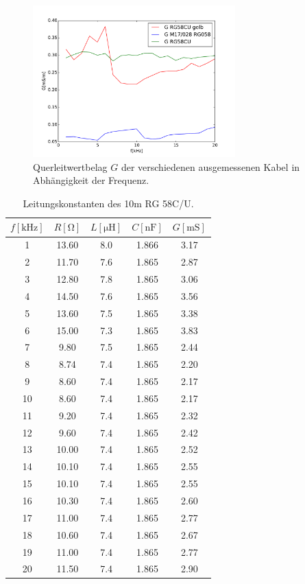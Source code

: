 \begin{figure}
\begin{minipage}{7.8cm}
	\end{minipage}
	\begin{minipage}{7.8cm}
		\includegraphics[width = 7.8cm]{data/a/G.pdf}
		\caption[]{Querleitwertbelag $G$ der verschiedenen ausgemessenen Kabel in Abhängigkeit der Frequenz.}
		\label{fig_konst4}
	\end{minipage}
\end{figure}

\begin{table}
\centering
	\caption[]{Leitungskonstanten des 10m RG 58C/U.}
    \begin{tabular}{S[table-format=2.0] S[table-format=2.2] S[table-format=1.1] S[table-format=1.3] S[table-format=1.2]}
		\toprule
        {$f[\si{\kilo\hertz}]$} & {$R[\si{\ohm}]$} & {$L[\si{\micro\henry}]$} & {$C[\si{\nano \farad}]$} & {$G[\si{\milli\siemens}]$} \\
			&	13.60	&	8.0	&	1.866	&	3.17\\
		  2	&	11.70	&	7.6	&	1.865	&	2.87\\
		  3	&	12.80	&	7.8	&	1.865	&	3.06\\
		  4	&	14.50	&	7.6	&	1.865	&	3.56\\
		  5	&	13.60	&	7.5	&	1.865	&	3.38\\
		  6	&	15.00	&	7.3	&	1.865	&	3.83\\
		  7	&	 9.80	&	7.5	&	1.865	&	2.44\\
		  8	&	 8.74	&	7.4	&	1.865	&	2.20\\
		  9	&	 8.60	&	7.4	&	1.865	&	2.17\\
		 10	&	 8.60	&	7.4	&	1.865	&	2.17\\
		 11	&	 9.20	&	7.4	&	1.865	&	2.32\\
		 12	&	 9.60	&	7.4	&	1.865	&	2.42\\
		 13	&	10.00	&	7.4	&	1.865	&	2.52\\
		 14	&	10.10	&	7.4	&	1.865	&	2.55\\
		 15	&	10.10	&	7.4	&	1.865	&	2.55\\
		 16	&	10.30	&	7.4	&	1.865	&	2.60\\
		 17	&	11.00	&	7.4	&	1.865	&	2.77\\
		 18	&	10.60	&	7.4	&	1.865	&	2.67\\
		 19	&	11.00	&	7.4	&	1.865	&	2.77\\
		 20	&	11.50	&	7.4	&	1.865	&	2.90\\
		\bottomrule
	\end{tabular}
	\label{tab_konst1}
\end{table}


